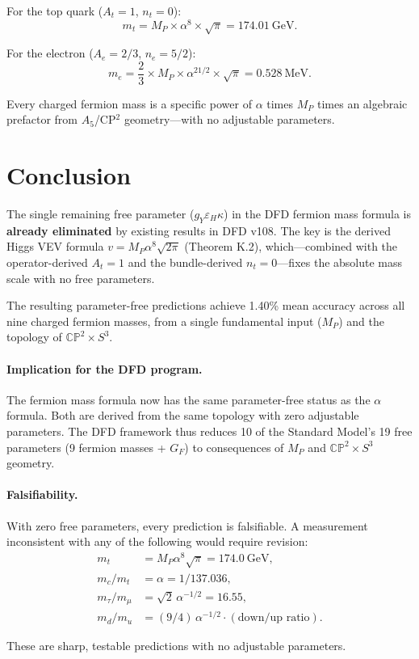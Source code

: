 \documentclass[11pt,a4paper]{article}
\newcommand{\CP}{\mathbb{CP}}
\theoremstyle{definition}
\theoremstyle{remark}
\begin{document}
For the top quark ($A_t = 1$, $n_t = 0$):
\begin{equation}
m_t = M_P \times \alpha^8 \times \sqrt{\pi} = 174.01~\text{GeV}.
\end{equation}

For the electron ($A_e = 2/3$, $n_e = 5/2$):
\begin{equation}
m_e = \frac{2}{3} \times M_P \times \alpha^{21/2} \times \sqrt{\pi} = 0.528~\text{MeV}.
\end{equation}

Every charged fermion mass is a specific power of $\alpha$ times $M_P$
times an algebraic prefactor from $A_5$/CP$^2$ geometry---with no adjustable
parameters.

\section{Conclusion}
\label{sec:conclusion}

The single remaining free parameter ($g_Y\varepsilon_H\kappa$) in the DFD
fermion mass formula is \textbf{already eliminated} by existing results in
DFD v108. The key is the derived Higgs VEV formula
$v = M_P\alpha^8\sqrt{2\pi}$ (Theorem K.2), which---combined with the
operator-derived $A_t = 1$ and the bundle-derived $n_t = 0$---fixes the
absolute mass scale with no free parameters.

The resulting parameter-free predictions achieve 1.40\% mean accuracy
across all nine charged fermion masses, from a single fundamental input
($M_P$) and the topology of $\CP^2 \times S^3$.

\paragraph{Implication for the DFD program.}
The fermion mass formula now has the same parameter-free status as the
$\alpha$ formula. Both are derived from the same topology with zero
adjustable parameters. The DFD framework thus reduces 10 of the Standard
Model's 19 free parameters (9 fermion masses + $G_F$) to consequences of
$M_P$ and $\CP^2 \times S^3$ geometry.

\paragraph{Falsifiability.}
With zero free parameters, every prediction is falsifiable. A measurement
inconsistent with any of the following would require revision:
\begin{align}
m_t &= M_P\alpha^8\sqrt{\pi} = 174.0~\text{GeV}, \\
m_c/m_t &= \alpha = 1/137.036, \\
m_\tau/m_\mu &= \sqrt{2}\,\alpha^{-1/2} = 16.55, \\
m_d/m_u &= (9/4)\,\alpha^{-1/2}\cdot(\text{down/up ratio}) .
\end{align}

These are sharp, testable predictions with no adjustable parameters.
\end{document}
